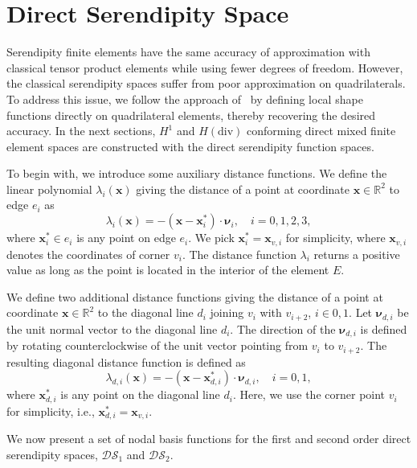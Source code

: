 %
\section{Direct Serendipity Space}
\label{sec:ds}
Serendipity finite elements have the same accuracy of approximation with 
classical tensor product elements while using fewer degrees of freedom.
However, the classical serendipity spaces suffer from poor approximation
on quadrilaterals. 
To address this issue, we follow the approach of~\cite{directSerendipity}
by defining local shape functions directly on quadrilateral elements, thereby recovering the desired accuracy.
In the next sections, $H^1$ and $H(\text{div})$ conforming direct mixed finite element spaces
are constructed with the direct serendipity function spaces.

To begin with, we introduce some auxiliary distance functions. 
We define the linear polynomial $\lambda_i(\mathbf{x})$ giving the
distance of a point at coordinate $\mathbf{x}\in \mathbb{R}^2$ to edge $e_i$ as
\begin{equation}\label{eq:distancelambda}
		  \lambda_i(\mathbf{x}) = -(\mathbf{x}-\mathbf{x}^*_i)\cdot \pmb{\nu}_i, \quad i = 0,1,2,3,
\end{equation}
where $\mathbf{x}^*_i \in e_i$  is any point on edge $e_i$.
We pick $\mathbf{x}^*_i = \mathbf{x}_{v,i}$ for simplicity, where $\mathbf{x}_{v,i}$ denotes
the coordinates of corner $v_i$.
The
distance function $\lambda_i$ returns a positive value as long as the point is located in the
interior of the element $E$. 

We define two additional distance functions giving 
the distance of a point at coordinate $\mathbf{x} \in \mathbb{R}^2$ to the diagonal line $d_{i}$ 
joining $v_i$ with $v_{i+2}$, $i\in{0,1}$.
Let $\pmb{\nu}_{d,i}$ be the unit normal vector to the diagonal line 
$d_{i}$. The direction of the $\mathbf{\nu}_{d,i}$ is defined by 
rotating counterclockwise of the unit vector pointing from $v_i$ to $v_{i+2}$.
The resulting diagonal distance function is defined as
\begin{equation}\label{eq:distancelambdad}
		  \lambda_{d,i}(\mathbf{x}) = -(\mathbf{x} - \mathbf{x}^*_{d,i}) \cdot \pmb{\nu}_{d,i}, 
		  \quad i=0,1,
\end{equation}
where $\mathbf{x}^*_{d,i}$ is any point on the diagonal line $d_{i}$. Here,
we use the corner point $v_i$ for simplicity, i.e.,
$\mathbf{x}^*_{d,i} = \mathbf{x}_{v,i}$.

We now present a set of nodal basis functions for the first and second
order direct serendipity spaces, $\mathcal{DS}_1$ and $\mathcal{DS}_2$.

